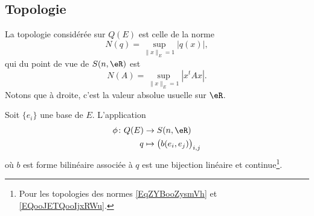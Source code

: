 \subsection{Topologie}

La topologie considérée sur \( Q(E)\) est celle de la norme
\begin{equation}    \label{EqZYBooZysmVh}
	N(q)=\sup_{\| x \|_E=1}| q(x) |,
\end{equation}
qui du point de vue de \( S(n,\eR)\) est
\begin{equation}    \label{EQooJETQooIjxRWu}
	N(A)=\sup_{\| x \|_E=1}| x^tAx |.
\end{equation}
Notons que à droite, c'est la valeur absolue usuelle sur \( \eR\).

\begin{proposition} \label{PropFSXooRUMzdb}
	Soit \( \{ e_i \}\) une base de \( E\). L'application
	\begin{equation}
		\begin{aligned}
			\phi\colon Q(E) & \to S(n,\eR)                             \\
			q               & \mapsto \big(   b(e_i,e_j)   \big)_{i,j}
		\end{aligned}
	\end{equation}
	où \( b\) est forme bilinéaire associée à \( q\) est une bijection linéaire et continue\footnote{Pour les topologies des normes \eqref{EqZYBooZysmVh} et \eqref{EQooJETQooIjxRWu}.}.
\end{proposition}

